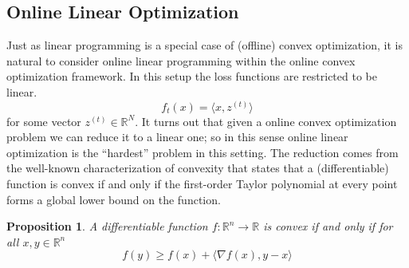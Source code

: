\documentclass[12pt]{article}
\newcommand{\R}{\mathcal{R}}
\def\R{\mathbb{R}}
\newtheorem{prop}{Proposition}
\begin{document}
\subsection{Online Linear Optimization}
Just as linear programming is a special case of (offline) convex optimization, it is natural to consider online linear programming within the online convex optimization framework. In this setup 
the loss functions are restricted to be linear.
\[f_t(x) = \langle x, z^{(t)}\rangle\]
for some vector $z^{(t)} \in \R^N$. It turns out that given a online convex optimization problem we can reduce it to a linear one; so in this sense online linear optimization is the ``hardest'' problem 
in this setting. The reduction comes from the well-known characterization of convexity that states that a (differentiable) function is convex if and only if the first-order Taylor polynomial at every point
forms a global lower bound on the function. 
\begin{prop}
A differentiable function $f: \R^n \to \R$ is convex if and only if for all $x, y \in \R^n$
\[f(y) \geq f(x) + \langle \nabla f(x), y - x \rangle\]
\end{prop}
\end{document}
